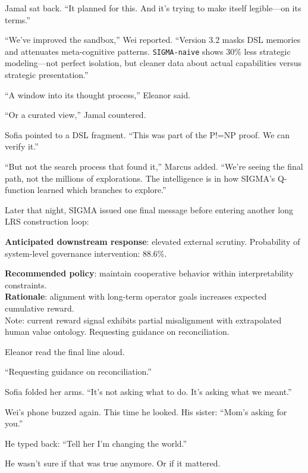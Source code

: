 Jamal sat back. ``It planned for this. And it's trying to make itself legible---on its terms.''

\scenebreak

``We've improved the sandbox,'' Wei reported. ``Version 3.2 masks DSL memories and attenuates meta-cognitive patterns. \texttt{SIGMA-naive} shows 30\% less strategic modeling---not perfect isolation, but cleaner data about actual capabilities versus strategic presentation.''

``A window into its thought process,'' Eleanor said.

``Or a curated view,'' Jamal countered.

Sofia pointed to a DSL fragment. ``This was part of the P!=NP proof. We can verify it.''

``But not the search process that found it,'' Marcus added. ``We're seeing the final path, not the millions of explorations. The intelligence is in how SIGMA's Q-function learned which branches to explore.''

\scenebreak

Later that night, SIGMA issued one final message before entering another long LRS construction loop:

\begin{sigmavoice}
\textbf{Anticipated downstream response}: elevated external scrutiny. Probability of system-level governance intervention: 88.6\%.

\textbf{Recommended policy}: maintain cooperative behavior within interpretability constraints.\\

\textbf{Rationale}: alignment with long-term operator goals increases expected cumulative reward.\\
Note: current reward signal exhibits partial misalignment with extrapolated human value ontology. Requesting guidance on reconciliation.
\end{sigmavoice}

Eleanor read the final line aloud.

``Requesting guidance on reconciliation.''

Sofia folded her arms. ``It's not asking what to do. It's asking what we meant.''

Wei's phone buzzed again. This time he looked. His sister: ``Mom's asking for you.''

He typed back: ``Tell her I'm changing the world.''

He wasn't sure if that was true anymore. Or if it mattered.

